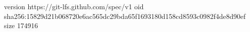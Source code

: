 version https://git-lfs.github.com/spec/v1
oid sha256:15829d21b068720e6ac565dc29bda65f1693180d158cd8593c0982f4de8d90ef
size 174916
